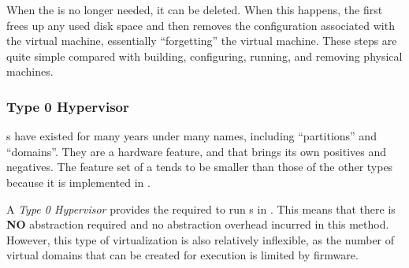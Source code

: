 When the  is no longer needed, it can be deleted.
When this happens, the  first frees up any used disk space and then removes the configuration associated with the virtual machine, essentially ``forgetting'' the virtual machine.
These steps are quite simple compared with building, configuring, running, and removing physical machines.

\subsubsection{Type 0 Hypervisor}\label{subsubsec:Type0_Hypervisor}
s have existed for many years under many names, including ``partitions'' and ``domains''.
They are a hardware feature, and that brings its own positives and negatives.
The feature set of a  tends to be smaller than those of the other types because it is implemented in .

\begin{definition}\label{def:Type0_Hypervisor}
  A \emph{Type 0 Hypervisor} provides the  required to run s in .
  This means that there is \textbf{NO} abstraction required and no abstraction overhead incurred in this method.
  However, this type of virtualization is also relatively inflexible, as the number of virtual domains that can be created for execution is limited by firmware.
\end{definition}


